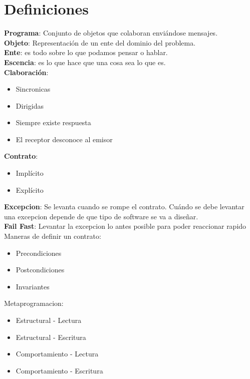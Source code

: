 \section{Definiciones}

\textbf{Programa}: Conjunto de objetos que colaboran enviándose mensajes. \\

\textbf{Objeto}: Representación de un ente del dominio del problema. \\

\textbf{Ente}: es todo sobre lo que podamos pensar o hablar. \\

\textbf{Escencia}: es lo que hace que una cosa sea lo que es. \\

\textbf{Claboración}:
\begin{itemize}
\item Sincronicas
\item Dirigidas
\item Siempre existe respuesta
\item El receptor desconoce al emisor
\end{itemize}

\textbf{Contrato}:
\begin{itemize}
	\item Implícito
	\item Explícito
\end{itemize}

\textbf{Excepcion}: Se levanta cuando se rompe el contrato. Cuándo se debe levantar una excepcion depende de que tipo de software se va a diseñar. \\

\textbf{Fail Fast}: Levantar la excepcion lo antes posible para poder reaccionar rapido \\

Maneras de definir un contrato:
\begin{itemize}
\item Precondiciones
\item Postcondiciones
\item Invariantes
\end{itemize}

Metaprogramacion:
\begin{itemize}
\item Estructural - Lectura
\item Estructural - Escritura
\item Comportamiento - Lectura
\item Comportamiento - Escritura
\end{itemize}

